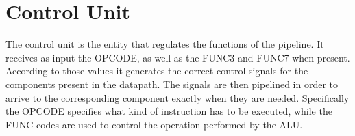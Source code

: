 %
\chapter{Control Unit}
\label{cha3}
The control unit is the entity that regulates the functions of the pipeline. It receives as input the OPCODE, as well as the FUNC3 and FUNC7 when present. 
According to those values it generates the correct control signals for the components present in the datapath. The signals are then pipelined in order to 
arrive to the corresponding component exactly when they are needed. Specifically the OPCODE specifies what kind of instruction has to be executed, while the
FUNC codes are used to control the operation performed by the ALU.



